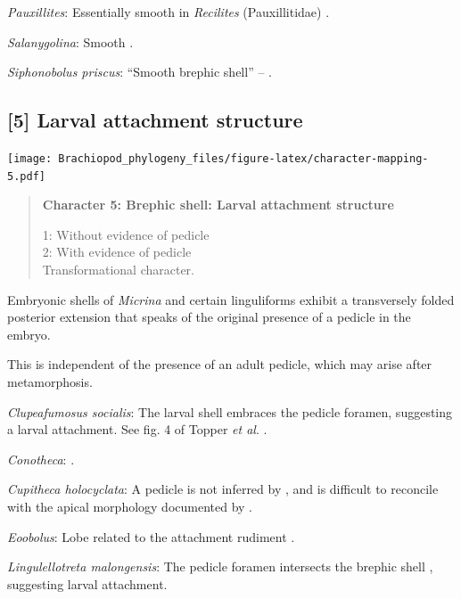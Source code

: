 \documentclass[openany]{book}
\begin{document}
\hypertarget{Pauxillites-coding-4}{}
\emph{Pauxillites}: Essentially smooth in \emph{Recilites}
(Pauxillitidae) \citep{Dzik1978}.

\hypertarget{Salanygolina-coding-4}{}
\emph{Salanygolina}: Smooth \citep{Holmer2009Theenigmatic}.

\hypertarget{Siphonobolus_priscus-coding-4}{}
\emph{Siphonobolus priscus}: ``Smooth brephic shell'' --
\citet{Popov2009Earlyontogeny}.

\subsection*{{[}5{]} Larval attachment
structure}\label{larval-attachment-structure}

\texttt{[image: Brachiopod\_phylogeny\_files/figure-latex/character-mapping-5.pdf]}

\begin{quote}
\textbf{Character 5: Brephic shell: Larval attachment structure}

1: Without evidence of pedicle\\
2: With evidence of pedicle\\
Transformational character.
\end{quote}

Embryonic shells of \emph{Micrina} and certain linguliforms exhibit a
transversely folded posterior extension that speaks of the original
presence of a pedicle in the embryo.

This is independent of the presence of an adult pedicle, which may arise
after metamorphosis.

\hypertarget{Clupeafumosus_socialis-coding-5}{}
\emph{Clupeafumosus socialis}: The larval shell embraces the pedicle
foramen, suggesting a larval attachment. See fig. 4 of Topper \emph{et
al}. \citeyearpar{Topper2013Reappraisalof}.

\hypertarget{Conotheca-coding-5}{}
\emph{Conotheca}: \citep{Wrona2003}.

\hypertarget{Cupitheca_holocyclata-coding-5}{}
\emph{Cupitheca holocyclata}: A pedicle is not inferred by
\citet{Skovsted2016}, and is difficult to reconcile with the apical
morphology documented by \citet{Sun2018}.

\hypertarget{Eoobolus-coding-5}{}
\emph{Eoobolus}: Lobe related to the attachment rudiment \citep[fig.
2]{Balthasar2009Thebrachiopod}.

\hypertarget{Lingulellotreta_malongensis-coding-5}{}
\emph{Lingulellotreta malongensis}: The pedicle foramen intersects the
brephic shell \citep{Holmer1997EarlyCambrian, Li2004}, suggesting larval
attachment.
\end{document}
